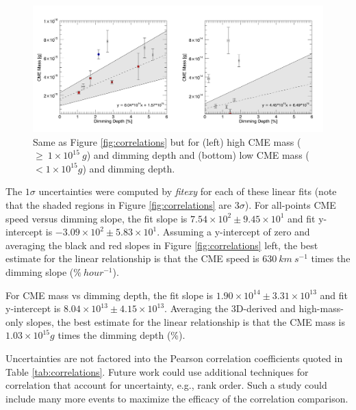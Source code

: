 \begin{figure}[!h]
    \begin{center}
	    \includegraphics[width=\textwidth]{Images/CorrelationsMassHighAndLow.png}
    \end{center}
    \caption[Correlations: dimming depth vs high and low CME mass]{
        Same as Figure \ref{fig:correlations} but for (left) high CME mass ($\geq\ 1 \times 10^{15}\ g$) and dimming depth 
        and (bottom) low CME mass ($< 1 \times 10^{15} g$) and dimming depth. 
   	}
    \label{fig:correlationshighlowmass}
\end{figure}

The $1\sigma$ uncertainties were computed by \textit{fitexy} for each of these linear fits (note that the shaded regions in Figure \ref{fig:correlations} are $3\sigma$). For all-points CME speed versus dimming slope, the fit slope is $7.54 \times 10^2 \pm 9.45 \times 10^1$ and fit y-intercept is $-3.09 \times 10^2 \pm 5.83 \times 10^1$. Assuming a y-intercept of zero and averaging the black and red slopes in Figure \ref{fig:correlations} left, the best estimate for the linear relationship is that the CME speed is $630\ km\ s^{-1}$ times the dimming slope ($\%\ hour^{-1}$).

For CME mass vs dimming depth, the fit slope is $1.90 \times 10^{14} \pm 3.31 \times 10^{13}$ and fit y-intercept is $8.04 \times 10^{13} \pm 4.15 \times 10^{13}$. Averaging the 3D-derived and high-mass-only slopes, the best estimate for the linear relationship is that the CME mass is $1.03 \times 10^{15} g$ times the dimming depth (\%).

Uncertainties are not factored into the Pearson correlation coefficients quoted in Table \ref{tab:correlations}. Future work could use additional techniques for correlation that account for uncertainty, e.g., rank order. Such a study could include many more events to maximize the efficacy of the correlation comparison.

